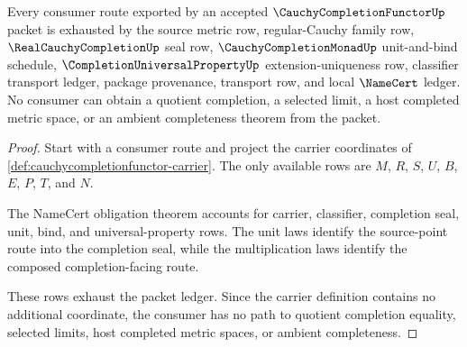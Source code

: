 \begin{theorem}
\label{thm:cauchycompletionfunctor-ledger-exactness}
Every consumer route exported by an accepted $\CauchyCompletionFunctorUp$ packet is exhausted by the source metric row, regular-Cauchy family row, $\RealCauchyCompletionUp$ seal row, $\CauchyCompletionMonadUp$ unit-and-bind schedule, $\CompletionUniversalPropertyUp$ extension-uniqueness row, classifier transport ledger, package provenance, transport row, and local $\NameCert$ ledger. No consumer can obtain a quotient completion, a selected limit, a host completed metric space, or an ambient completeness theorem from the packet.
\end{theorem}
\begin{proof}
Start with a consumer route and project the carrier coordinates of \autoref{def:cauchycompletionfunctor-carrier}. The only available rows are $M$, $R$, $S$, $U$, $B$, $E$, $P$, $T$, and $N$.

The NameCert obligation theorem accounts for carrier, classifier, completion seal, unit, bind, and universal-property rows. The unit laws identify the source-point route into the completion seal, while the multiplication laws identify the composed completion-facing route.

These rows exhaust the packet ledger. Since the carrier definition contains no additional coordinate, the consumer has no path to quotient completion equality, selected limits, host completed metric spaces, or ambient completeness.
\end{proof}

